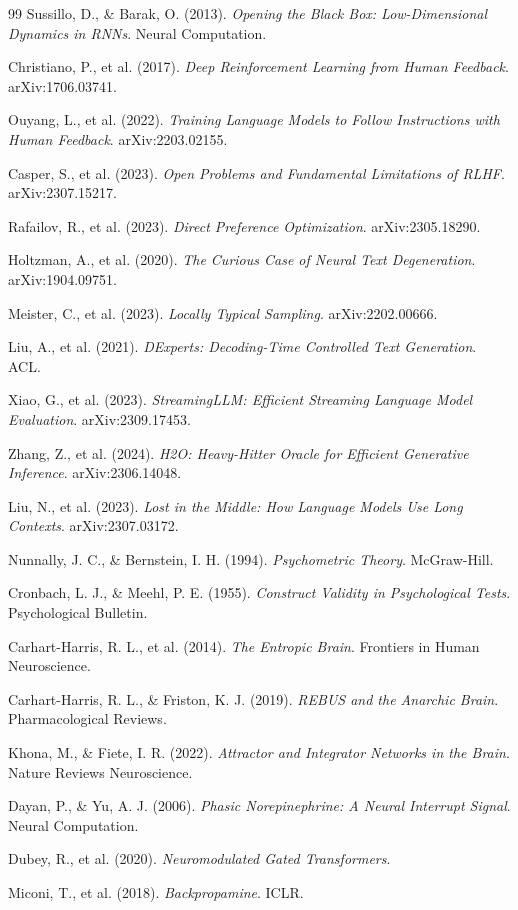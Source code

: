 \documentclass[10pt]{article}
\begin{document}
\begin{thebibliography}{99}
Sussillo, D., \& Barak, O. (2013). \textit{Opening the Black Box: Low-Dimensional Dynamics in RNNs}. Neural Computation.

Christiano, P., et al. (2017). \textit{Deep Reinforcement Learning from Human Feedback}. arXiv:1706.03741.

Ouyang, L., et al. (2022). \textit{Training Language Models to Follow Instructions with Human Feedback}. arXiv:2203.02155.

Casper, S., et al. (2023). \textit{Open Problems and Fundamental Limitations of RLHF}. arXiv:2307.15217.

Rafailov, R., et al. (2023). \textit{Direct Preference Optimization}. arXiv:2305.18290.

Holtzman, A., et al. (2020). \textit{The Curious Case of Neural Text Degeneration}. arXiv:1904.09751.

Meister, C., et al. (2023). \textit{Locally Typical Sampling}. arXiv:2202.00666.

Liu, A., et al. (2021). \textit{DExperts: Decoding-Time Controlled Text Generation}. ACL.

Xiao, G., et al. (2023). \textit{StreamingLLM: Efficient Streaming Language Model Evaluation}. arXiv:2309.17453.

Zhang, Z., et al. (2024). \textit{H2O: Heavy-Hitter Oracle for Efficient Generative Inference}. arXiv:2306.14048.

Liu, N., et al. (2023). \textit{Lost in the Middle: How Language Models Use Long Contexts}. arXiv:2307.03172.

Nunnally, J. C., \& Bernstein, I. H. (1994). \textit{Psychometric Theory}. McGraw-Hill.

Cronbach, L. J., \& Meehl, P. E. (1955). \textit{Construct Validity in Psychological Tests}. Psychological Bulletin.

Carhart-Harris, R. L., et al. (2014). \textit{The Entropic Brain}. Frontiers in Human Neuroscience.

Carhart-Harris, R. L., \& Friston, K. J. (2019). \textit{REBUS and the Anarchic Brain}. Pharmacological Reviews.

Khona, M., \& Fiete, I. R. (2022). \textit{Attractor and Integrator Networks in the Brain}. Nature Reviews Neuroscience.

Dayan, P., \& Yu, A. J. (2006). \textit{Phasic Norepinephrine: A Neural Interrupt Signal}. Neural Computation.

Dubey, R., et al. (2020). \textit{Neuromodulated Gated Transformers}.

Miconi, T., et al. (2018). \textit{Backpropamine}. ICLR.

\end{thebibliography}
\end{document}
